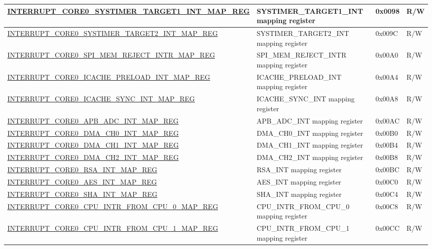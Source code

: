 \begin{longtable}{ | p{10cm} | m{9cm} | m{1.3cm} | m{1.0cm} | }
\hyperref[regdesc:INTERRUPTCORE0SYSTIMERTARGET1INTMAPREG]{INTERRUPT\_CORE0\_SYSTIMER\_TARGET1\_INT\_MAP\_REG} & SYSTIMER\_TARGET1\_INT mapping register & 0x0098 & R/W \\ \hline
\hyperref[regdesc:INTERRUPTCORE0SYSTIMERTARGET2INTMAPREG]{INTERRUPT\_CORE0\_SYSTIMER\_TARGET2\_INT\_MAP\_REG} & SYSTIMER\_TARGET2\_INT mapping register & 0x009C & R/W \\ \hline
\hyperref[regdesc:INTERRUPTCORE0SPIMEMREJECTINTRMAPREG]{INTERRUPT\_CORE0\_SPI\_MEM\_REJECT\_INTR\_MAP\_REG} & SPI\_MEM\_REJECT\_INTR mapping register & 0x00A0 & R/W \\ \hline
\hyperref[regdesc:INTERRUPTCORE0ICACHEPRELOADINTMAPREG]{INTERRUPT\_CORE0\_ICACHE\_PRELOAD\_INT\_MAP\_REG} & ICACHE\_PRELOAD\_INT mapping register & 0x00A4 & R/W \\ \hline
\hyperref[regdesc:INTERRUPTCORE0ICACHESYNCINTMAPREG]{INTERRUPT\_CORE0\_ICACHE\_SYNC\_INT\_MAP\_REG} & ICACHE\_SYNC\_INT mapping register & 0x00A8 & R/W \\ \hline
\hyperref[regdesc:INTERRUPTCORE0APBADCINTMAPREG]{INTERRUPT\_CORE0\_APB\_ADC\_INT\_MAP\_REG} & APB\_ADC\_INT mapping register & 0x00AC & R/W \\ \hline
\hyperref[regdesc:INTERRUPTCORE0DMACH0INTMAPREG]{INTERRUPT\_CORE0\_DMA\_CH0\_INT\_MAP\_REG} & DMA\_CH0\_INT mapping register & 0x00B0 & R/W \\ \hline
\hyperref[regdesc:INTERRUPTCORE0DMACH1INTMAPREG]{INTERRUPT\_CORE0\_DMA\_CH1\_INT\_MAP\_REG} & DMA\_CH1\_INT mapping register & 0x00B4 & R/W \\ \hline
\hyperref[regdesc:INTERRUPTCORE0DMACH2INTMAPREG]{INTERRUPT\_CORE0\_DMA\_CH2\_INT\_MAP\_REG} & DMA\_CH2\_INT mapping register & 0x00B8 & R/W \\ \hline
\hyperref[regdesc:INTERRUPTCORE0RSAINTMAPREG]{INTERRUPT\_CORE0\_RSA\_INT\_MAP\_REG} & RSA\_INT mapping register & 0x00BC & R/W \\ \hline
\hyperref[regdesc:INTERRUPTCORE0AESINTMAPREG]{INTERRUPT\_CORE0\_AES\_INT\_MAP\_REG} & AES\_INT mapping register & 0x00C0 & R/W \\ \hline
\hyperref[regdesc:INTERRUPTCORE0SHAINTMAPREG]{INTERRUPT\_CORE0\_SHA\_INT\_MAP\_REG} & SHA\_INT mapping register & 0x00C4 & R/W \\ \hline
\hyperref[regdesc:INTERRUPTCORE0CPUINTRFROMCPU0MAPREG]{INTERRUPT\_CORE0\_CPU\_INTR\_FROM\_CPU\_0\_MAP\_REG} & CPU\_INTR\_FROM\_CPU\_0 mapping register & 0x00C8 & R/W \\ \hline
\hyperref[regdesc:INTERRUPTCORE0CPUINTRFROMCPU1MAPREG]{INTERRUPT\_CORE0\_CPU\_INTR\_FROM\_CPU\_1\_MAP\_REG} & CPU\_INTR\_FROM\_CPU\_1 mapping register & 0x00CC & R/W \\ \hline

\end{longtable}
